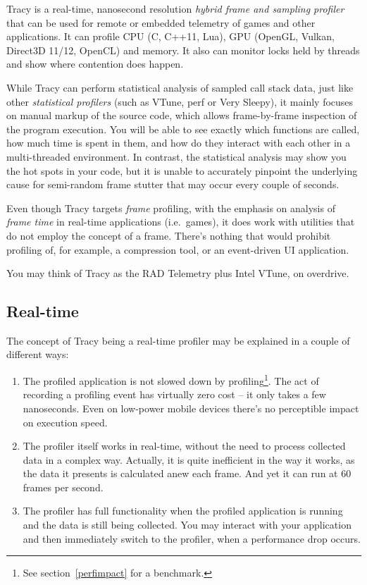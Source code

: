 \documentclass[hidelinks,titlepage,a4paper]{article}
\begin{document}
Tracy is a real-time, nanosecond resolution \emph{hybrid frame and sampling profiler} that can be used for remote or
embedded telemetry of games and other applications. It can profile CPU (C, C++11, Lua), GPU (OpenGL, Vulkan, Direct3D
11/12, OpenCL) and memory. It also can monitor locks held by threads and show where contention does happen.

While Tracy can perform statistical analysis of sampled call stack data, just like other \emph{statistical profilers} (such as VTune, perf or Very Sleepy), it mainly focuses on manual markup of the source code, which allows frame-by-frame inspection of the program execution. You will be able to see exactly which functions are called, how much time is spent in them, and how do they interact with each other in a multi-threaded environment. In contrast, the statistical analysis may show you the hot spots in your code, but it is unable to accurately pinpoint the underlying cause for semi-random frame stutter that may occur every couple of seconds.

Even though Tracy targets \emph{frame} profiling, with the emphasis on analysis of \emph{frame time} in real-time applications (i.e.~games), it does work with utilities that do not employ the concept of a frame. There's nothing that would prohibit profiling of, for example, a compression tool, or an event-driven UI application.

You may think of Tracy as the RAD Telemetry plus Intel VTune, on overdrive.

\subsection{Real-time}

The concept of Tracy being a real-time profiler may be explained in a couple of different ways:

\begin{enumerate}
\item The profiled application is not slowed down by profiling\footnote{See section~\ref{perfimpact} for a benchmark.}. The act of recording a profiling event has virtually zero cost -- it only takes a few nanoseconds. Even on low-power mobile devices there's no perceptible impact on execution speed.
\item The profiler itself works in real-time, without the need to process collected data in a complex way. Actually, it is quite inefficient in the way it works, as the data it presents is calculated anew each frame. And yet it can run at 60 frames per second.
\item The profiler has full functionality when the profiled application is running and the data is still being collected. You may interact with your application and then immediately switch to the profiler, when a performance drop occurs.
\end{enumerate}
\end{document}
